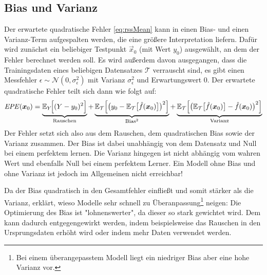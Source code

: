 		\subsection{Bias und Varianz}
			Der erwartete quadratische Fehler \eqref{eq:rssMean} kann in einen Bias- und einen Varianz-Term aufgespalten werden, die eine größere Interpretation liefern. Dafür wird zunächst ein beliebiger Testpunkt \( \vec{x}_0 \) (mit Wert \( y_0 \)) ausgewählt, an dem der Fehler berechnet werden soll. Es wird außerdem davon ausgegangen, dass die Trainingsdaten eines beliebigen Datensatzes \(\mathcal{T}\) verrauscht sind, \dh es gibt einen Messfehler \( \epsilon \sim \mathcal{N}(0, \sigma_\epsilon^2) \) mit Varianz \(\sigma_\epsilon^2\) und Erwartungswert \(0\). Der erwartete quadratische Fehler teilt sich dann wie folgt auf:
			\begin{equation}
				\mathit{EPE}(\bm{x}_0)
					= \underbrace{\mathbb{E}_Y\!\Big[ (Y - y_0)^2 \Big]}_\text{Rauschen}
					+ \underbrace{\mathbb{E}_{\mathcal{T}}\Big[ \big( y_0 - \mathbb{E}_{\mathcal{T}}\big[ \hat{f}(\bm{x}_0) \big] \big)^2 \Big]}_{\text{Bias}^2}
					+ \underbrace{\mathbb{E}_{\mathcal{T}}\Big[ \big( \mathbb{E}_{\mathcal{T}}\big[ \hat{f}(\bm{x}_0) \big] - \hat{f}(\bm{x}_0) \big)^2 \Big]}_\text{Varianz}
			\end{equation}
			Der Fehler setzt sich also aus dem Rauschen, dem quadratischen Bias sowie der Varianz zusammen. Der Bias ist dabei unabhängig von dem Datensatz und Null bei einem perfektem lernen. Die Varianz hingegen ist nicht abhängig vom wahren Wert und ebenfalls Null bei einem perfektem Lerner. Ein Modell ohne Bias und ohne Varianz ist jedoch im Allgemeinen nicht erreichbar!

			Da der Bias quadratisch in den Gesamtfehler einfließt und somit stärker als die Varianz, erklärt, wieso Modelle sehr schnell zu Überanpassung\footnote{Bei einem überangepasstem Modell liegt ein niedriger Bias aber eine hohe Varianz vor.} neigen: Die Optimierung des Bias ist "lohnenswerter", da dieser so stark gewichtet wird. Dem kann dadurch entgegengewirkt werden, indem beispielsweise das Rauschen in den Ursprungsdaten erhöht wird oder indem mehr Daten verwendet werden.

